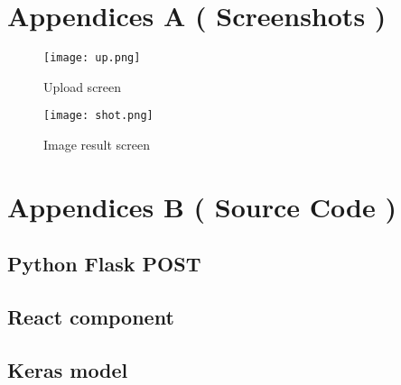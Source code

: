 {}

\section{Appendices A ( Screenshots )}

\begin{figure}[htb]
    \centering
    \texttt{[image: up.png]}
    \caption{Upload screen}
    \label{fig:modeldd}
\end{figure}

\begin{figure}[htb]
    \centering
    \texttt{[image: shot.png]}
    \caption{Image result screen}
    \label{fig:modeldd}
\end{figure}

\section{Appendices B ( Source Code )}

\subsection{Python Flask POST}



\subsection{React component}



\subsection{Keras model}

